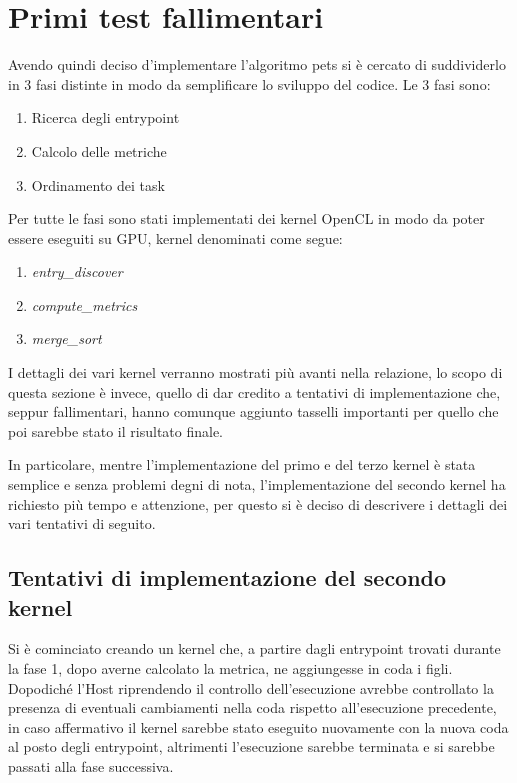 \documentclass[../relazione.tex]{subfiles}
\begin{document}
\section{Primi test fallimentari}

Avendo quindi deciso d'implementare l'algoritmo \gls{pets}\cite{ilavarasan2007low} si è cercato di suddividerlo in 3 fasi distinte in modo da semplificare lo sviluppo del codice. 
Le 3 fasi sono:
\begin{enumerate}
    \item Ricerca degli entrypoint
    \item Calcolo delle metriche
    \item Ordinamento dei task
\end{enumerate}
Per tutte le fasi sono stati implementati dei kernel OpenCL in modo da poter essere eseguiti su GPU, kernel denominati come segue:
\begin{enumerate}
    \item \textit{entry\_discover}
    \item \textit{compute\_metrics}
    \item \textit{merge\_sort}
\end{enumerate}

I dettagli dei vari kernel verranno mostrati più avanti nella relazione, lo scopo di questa 
sezione è invece, quello di dar credito a tentativi di implementazione che, seppur fallimentari, hanno comunque aggiunto tasselli importanti per quello che poi sarebbe stato il risultato finale.

In particolare, mentre l'implementazione del primo e del terzo kernel è stata semplice e senza problemi degni di nota, l'implementazione del secondo kernel ha richiesto più tempo e attenzione, per questo si è deciso di descrivere i dettagli dei vari tentativi di seguito.

\subsection{Tentativi di implementazione del secondo kernel}

Si è cominciato creando un kernel che, a partire dagli entrypoint trovati durante la fase 1, dopo averne calcolato la metrica, ne aggiungesse in coda i figli.
Dopodiché l'Host riprendendo il controllo dell'esecuzione avrebbe controllato la presenza di eventuali cambiamenti nella coda rispetto all'esecuzione precedente, in caso affermativo il kernel sarebbe stato eseguito nuovamente con la nuova coda al posto degli entrypoint, altrimenti l'esecuzione sarebbe terminata e si sarebbe passati alla fase successiva.
\end{document}
